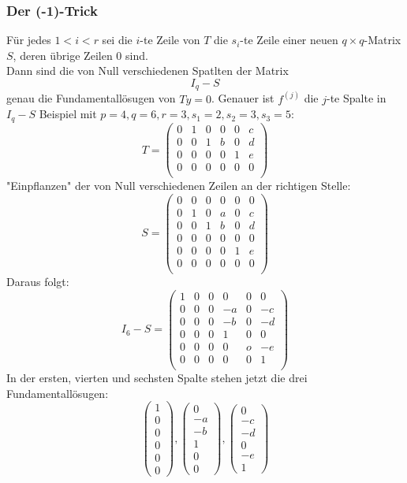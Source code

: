 \documentclass{kit}
\begin{document}
    \subsubsection{Der (-1)-Trick}
      Für jedes $1<i<r$ sei die $i$-te Zeile von $T$ die $s_i$-te Zeile einer neuen $q\times q$-Matrix $S$, deren übrige Zeilen 0 sind.\\
      Dann sind die von Null verschiedenen Spatlten der Matrix
      $$I_q-S$$
      genau die Fundamentallösugen von $Ty=0$. Genauer ist $f^{(j)}$ die $j$-te Spalte in $I_q-S$
      Beispiel mit $p=4, q=6,r=3,s_1=2,s_2=3,s_3=5$:
      $$T=\begin{pmatrix}
        0 & 1 & 0 & 0 & 0 & c\\
        0 & 0 & 1 & b & 0 & d\\
        0 & 0 & 0 & 0 & 1 & e\\
        0 & 0 & 0 & 0 & 0 & 0\\
      \end{pmatrix}$$
      "Einpflanzen" der von Null verschiedenen Zeilen an der richtigen Stelle:
      $$S=\begin{pmatrix}
        0 & 0 & 0 & 0 & 0 & 0\\
        0 & 1 & 0 & a & 0 & c\\
        0 & 0 & 1 & b & 0 & d\\
        0 & 0 & 0 & 0 & 0 & 0\\
        0 & 0 & 0 & 0 & 1 & e\\
        0 & 0 & 0 & 0 & 0 & 0\\
      \end{pmatrix}$$
      Daraus folgt:
      $$I_6-S=\begin{pmatrix}
        1 & 0 & 0 & 0 & 0 & 0\\
        0 & 0 & 0 & -a & 0 & -c\\
        0 & 0 & 0 & -b & 0 & -d\\
        0 & 0 & 0 & 1 & 0 & 0\\
        0 & 0 & 0 & 0 & o & -e\\
        0 & 0 & 0 & 0 & 0 & 1\\
      \end{pmatrix}$$
      In der ersten, vierten und sechsten Spalte stehen jetzt die drei Fundamentallösugen:
      $$\begin{pmatrix}
        1\\0\\0\\0\\0\\0
      \end{pmatrix},
      \begin{pmatrix}
        0\\-a\\-b\\1\\0\\0
      \end{pmatrix},
      \begin{pmatrix}
        0\\-c\\-d\\0\\-e\\1
      \end{pmatrix}$$
\end{document}
